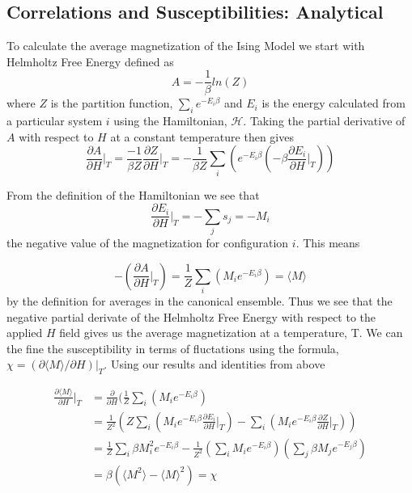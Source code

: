 \documentclass[a4paper,11pt]{article}
\begin{document}
    \subsection{Correlations and Susceptibilities: Analytical}
        To calculate the average magnetization of the Ising Model we start with Helmholtz Free Energy defined as        
        \begin{equation}
            A=-\frac{1}{\beta}ln(Z)
        \end{equation}
        where $Z$ is the partition function, $\sum_i e^{-E_i\beta}$ and $E_i$ is the energy calculated from a particular system $i$ using the Hamiltonian, $\mathcal{H}$. Taking the partial derivative of $A$ with respect to $H$ at a constant temperature then gives
        \begin{equation}
        \frac{\partial A}{\partial H}\bigg\vert_T = \frac{-1}{\beta Z}\frac{\partial{Z}}{\partial{H}}\bigg\vert_T =-\frac{1}{\beta Z} \sum_i( e^{-E_i\beta} (-\beta \frac{\partial{E_i}}{\partial{H}}\bigg\vert_T))
        \end{equation}

        From the definition of the Hamiltonian we see that
        \begin{equation}
            \frac{\partial{E_i}}{\partial{H}}\bigg\vert_T = -\sum_j s_j = -M_i
        \end{equation}
        the negative value of the magnetization for configuration $i$. This means

        \begin{equation}
            -(\frac{\partial A}{\partial H}\bigg\vert_T) = \frac{1}{Z}\sum_i( M_i e^{-E_i\beta}) = \langle M \rangle
        \end{equation}
        by the definition for averages in the canonical ensemble. Thus we see that the negative partial derivate of the Helmholtz Free Energy with respect to the applied $H$ field gives us the average magnetization at a temperature, T. We can the fine the susceptibility in terms of fluctations using the formula, $\chi = (\partial{\langle M \rangle}/\partial{H})|_T$. Using our results and identities from above
        
        \begin{equation}
        \begin{split}
            \frac{\partial \langle M \rangle}{\partial H}\bigg\vert_T &= \frac{\partial}{\partial H}(\frac{1}{Z}\sum_i( M_i e^{-E_i\beta}) \\
            &= \frac{1}{Z^2}(Z \sum_i( M_i e^{-E_i\beta} \frac{\partial{E_i}}{\partial{H}}\bigg\vert_T) - \sum_i( M_i e^{-E_i\beta}\frac{\partial{Z}}{\partial{H}}\bigg\vert_T))\\
            &=  \frac{1}{Z} \sum_i\beta M_i^2 e^{-E_i\beta} - \frac{1}{Z^2} (\sum_i M_i e^{-E_i\beta})(\sum_j \beta M_j e^{-E_j\beta})\\
            &= \beta (\langle M^2 \rangle - \langle M \rangle^2 ) = \chi
        \end{split}
        \end{equation}
\end{document}
